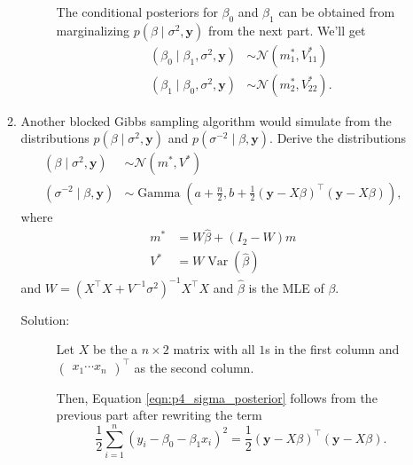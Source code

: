 \documentclass[letterpaper,11pt]{article}
\begin{document}
\begin{enumerate}
\begin{enumerate}
\begin{description}
      
      The conditional posteriors for $\beta_0$ and $\beta_1$ can be obtained
      from marginalizing $p\left(\beta \mid \sigma^2, \mathbf{y}\right)$ from
      the next part. We'll get
      \begin{align*}
        \left(\beta_0 \mid \beta_1, \sigma^2, \mathbf{y}\right)
        &\sim \mathcal{N}\left(m^*_1, V^*_{11}\right) \\
        \left(\beta_1 \mid \beta_0, \sigma^2, \mathbf{y}\right)
        &\sim \mathcal{N}\left(m^*_2, V^*_{22}\right).
      \end{align*}
    \end{description}
  \item Another blocked Gibbs sampling algorithm would simulate from the
    distributions $p\left(\beta \mid \sigma^2, \mathbf{y}\right)$ and
    $p\left(\sigma^{-2} \mid \beta, \mathbf{y}\right)$. Derive the distributions
    \begin{align}
      \left(\beta \mid \sigma^2, \mathbf{y} \right)
      &\sim \mathcal{N}\left(m^*, V^*\right)
      \label{eqn:p4_beta_posterior} \\
      \left(\sigma^{-2} \mid \beta, \mathbf{y} \right)
      &\sim \operatorname{Gamma}\left(
      a + \frac{n}{2}, b + \frac{1}{2}\left(\mathbf{y} - X\beta\right)^\intercal
      \left(\mathbf{y} - X\beta\right)
      \right),
      \label{eqn:p4_sigma_posterior}
    \end{align}
    where
    \begin{align*}
      m^* &= W\hat{\beta} + \left(I_2 - W\right)m \\
      V^* &= W\operatorname{Var}\left(\hat{\beta}\right)
    \end{align*}
    and $W = \left(X^\intercal X + V^{-1}\sigma^2\right)^{-1}X^\intercal X$ and
    $\hat{\beta}$ is the MLE of $\beta$.

    \begin{description}
    \item[Solution:] Let $X$ be the a $n \times 2$ matrix with all $1$s in the
      first column and $\begin{pmatrix} x_1 \cdots x_n\end{pmatrix}^\intercal$
      as the second column.

      Then, Equation \ref{eqn:p4_sigma_posterior} follows from the previous part
      after rewriting the term
      \begin{equation}
        \frac{1}{2}\sum_{i=1}^n\left(y_i - \beta_0 - \beta_1x_i\right)^2
        = \frac{1}{2}\left(\mathbf{y} - X\beta\right)^\intercal\left(\mathbf{y} - X\beta\right).
      \end{equation}


\end{description}
\end{enumerate}
\end{enumerate}
\end{document}
